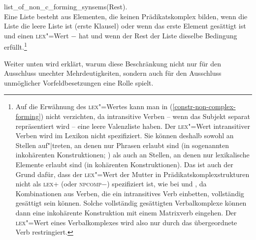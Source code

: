 \hfill        list\_of\_non\_c\_forming\_synsems(Rest).\\[2mm]
\zs
Eine Liste besteht aus Elementen, die keinen Prädikatskomplex bilden, wenn die Liste
die leere Liste ist (erste Klausel) oder wenn das erste Element gesättigt ist
und einen \textsc{lex}"=Wert $-$ 
hat und wenn der Rest der Liste dieselbe Bedingung erfüllt.\footnote{\label{fn-lex-intransitiv}%
        Auf die Erwähnung des \textsc{lex}"=Wertes kann man in (\ref{constr-non-complex-forming}) nicht verzichten,
        da intransitive Verben -- wenn das Subjekt separat repräsentiert wird -- eine
        leere Valenzliste haben. Der \textsc{lex}"=Wert intransitiver Verben wird
        im Lexikon nicht spezifiziert. Sie können deshalb sowohl an Stellen auf"|treten,
        an denen nur Phrasen erlaubt sind (in sogenannten inkohärenten Konstruktionen; \citealp{Bech55a})
        als auch an Stellen, an denen nur lexikalische Elemente erlaubt sind (in kohärenten Konstruktionen).
        Das ist auch der Grund dafür, dass der \textsc{lex}"=Wert der Mutter in
        Prädikatskomplexstrukturen nicht als \textsc{lex}+ (oder \textsc{npcomp}$-$) spezifiziert
        ist, wie \zb bei \citet[23]{HN94a} und \citet[177]{dKM2001a}, da Kombinationen aus Verben, die ein intransitives Verb einbetten,
        vollständig gesättigt sein können. Solche vollständig gesättigten Verbalkomplexe können dann eine
        inkohärente Konstruktion mit einem Matrixverb eingehen. Der \textsc{lex}"=Wert eines Verbalkomplexes
        wird also nur durch das übergeordnete Verb restringiert.%
}

Weiter unten wird erklärt, warum diese Beschränkung nicht nur für den Ausschluss
unechter Mehrdeutigkeiten, sondern auch für den Ausschluss unmöglicher Vorfeldbesetzungen
eine Rolle spielt.

